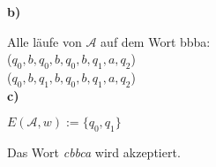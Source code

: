 \documentclass[a4paper,graphics,11pt]{article}
\begin{document}
\textbf{b)}

Alle läufe von $\mathcal{A}$ auf dem Wort bbba:\\
($q_0,b,q_0,b,q_0,b,q_1,a,q_2$)\\
($q_0,b,q_1,b,q_0,b,q_1,a,q_2$)\\

\textbf{c)}

$E(\mathcal{A},w):=\{q_0,q_1\}$

Das Wort \textit{cbbca} wird akzeptiert.\\
\end{document}
